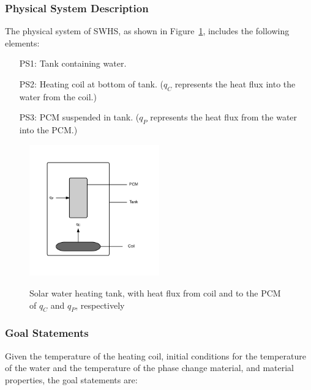 \documentclass[12pt]{article}
\newcommand{\progname}{SWHS}
\begin{document}
\subsubsection{Physical System Description}

The physical system of \progname{}, as shown in Figure~\ref{Fig_Tank},
includes the following elements:

\begin{itemize}

\item[PS1:] Tank containing water.

\item[PS2:] Heating coil at bottom of tank.  ($q_C$ represents the heat flux
   into the water from the coil.)

\item[PS3:] PCM suspended in tank.  ($q_P$ represents
  the heat flux from the water into the PCM.)

\end{itemize}

\begin{figure}[h!]
\begin{center}
{
 \includegraphics[width=0.5\textwidth]{Tank.png}
}
\caption{\label{Fig_Tank} Solar water heating tank, with heat flux from coil 
and to the PCM of $q_C$ and $q_P$, respectively}
\end{center}
\end{figure}

\subsubsection{Goal Statements}

\noindent Given the temperature of the heating coil, initial conditions for the
temperature of the water and the temperature of the phase change material, and
material properties, the goal statements are:
\end{document}
